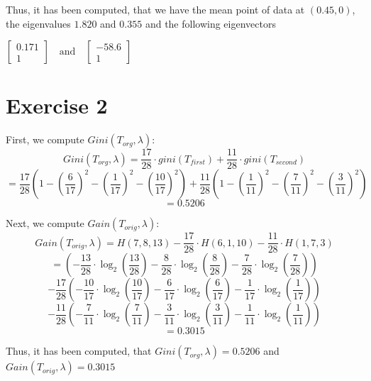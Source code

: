 \documentclass{report}
\begin{document}
Thus, it has been computed, that we have the mean point of data at $(0.45, 0)$, the eigenvalues $1.820$ and $0.355$ and the following eigenvectors
\begin{center}
    \begin{math}
        \left[
            \begin{array}{c}
                0.171 \\
                1
            \end{array}
        \right]
        \quad
        \text{and}
        \quad
        \left[
            \begin{array}{c}
                -58.6 \\
                1
            \end{array}
        \right]
    \end{math}
\end{center}
\section*{Exercise 2}
First, we compute $Gini(T_{org}, \lambda)$:
$$Gini(T_{org}, \lambda) = \frac{17}{28} \cdot gini(T_{first}) + \frac{11}{28} \cdot gini(T_{second})$$
$$= \frac{17}{28} \left(1 - \left(\frac{6}{17}\right)^2 - \left( \frac{1}{17} \right)^2 - \left( \frac{10}{17} \right)^2 \right) + \frac{11}{28} \left(1 - \left( \frac{1}{11} \right)^2 - \left( \frac{7}{11} \right)^2 - \left( \frac{3}{11} \right)^2 \right)$$
$$ = 0.5206$$

Next, we compute $Gain(T_{orig}, \lambda)$:
$$Gain(T_{orig}, \lambda) = H(7, 8, 13) - \frac{17}{28} \cdot H(6, 1, 10) - \frac{11}{28} \cdot H(1, 7, 3)$$
$$ = \left(-\frac{13}{28} \cdot \log_2 \left(\frac{13}{28} \right) - \frac{8}{28} \cdot \log_2 \left( \frac{8}{28} \right) - \frac{7}{28} \cdot \log_2 \left( \frac{7}{28} \right) \right)$$
$$ - \frac{17}{28} \left( - \frac{10}{17} \cdot \log_2 \left( \frac{10}{17} \right) - \frac{6}{17} \cdot \log_2 \left( \frac{6}{17} \right) - \frac{1}{17} \cdot \log_2 \left( \frac{1}{17} \right) \right)$$
$$ - \frac{11}{28} \left( - \frac{7}{11} \cdot \log_2 \left( \frac{7}{11} \right) - \frac{3}{11} \cdot \log_2 \left( \frac{3}{11} \right) - \frac{1}{11} \cdot \log_2 \left( \frac{1}{11} \right) \right)$$
$$= 0.3015$$

Thus, it has been computed, that $Gini(T_{org}, \lambda) = 0.5206$ and $Gain(T_{orig}, \lambda) = 0.3015$
\end{document}
